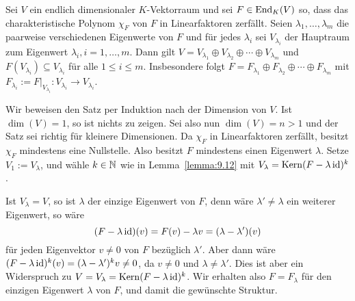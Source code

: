 \begin{satz}
	\label{satz:9.15}
	Sei $V$ ein endlich dimensionaler $K$-Vektorraum und sei $F \in \operatorname{End}_K(V)$ so, dass das charakteristische Polynom $\chi_F$ von $F$ in Linearfaktoren zerfällt.
	Seien $\lambda_1,\dots,\lambda_m$ die paarweise verschiedenen Eigenwerte von $F$ und für jedes $\lambda_i$ sei $V_{\lambda_i}$ der Hauptraum zum Eigenwert $\lambda_i, i = 1, \dots, m$.
	Dann gilt $V = V_{\lambda_1} \oplus V_{\lambda_2} \oplus \cdots \oplus V_{\lambda_m}$ und $F(V_{\lambda_i}) \subseteq V_{\lambda_i}$ für alle $1 \leq i \leq m$.
	Insbesondere folgt $F = F_{\lambda_1} \oplus F_{\lambda_2} \oplus \cdots \oplus F_{\lambda_m}$ mit $F_{\lambda_i} := F\big|_{V_{\lambda_i}} \colon V_{\lambda_i} \rightarrow V_{\lambda_i}$.
\end{satz}

\begin{beweis}
	Wir beweisen den Satz per Induktion nach der Dimension von $V$.
	Ist $\dim(V) = 1$, so ist nichts zu zeigen.
	Sei also nun $\dim(V) = n > 1$ und der Satz sei richtig für kleinere Dimensionen.
	Da $\chi_F$ in Linearfaktoren zerfällt, besitzt $\chi_F$ mindestens eine Nullstelle.
	Also besitzt $F$ mindestens einen Eigenwert $\lambda$.
	Setze $V_1 := V_\lambda$, und wähle $k \in \mathbb{N}$ wie in Lemma~\ref{lemma:9.12} mit $V_\lambda = \operatorname{Kern}(F - \lambda \operatorname{id})^k$.
	
	Ist $V_\lambda = V$, so ist $\lambda$ der einzige Eigenwert von $F$, denn wäre $\lambda' \neq \lambda$ ein weiterer Eigenwert, so wäre
	\[
		(F-\lambda \operatorname{id})(v) = F(v) - \lambda v = (\lambda - \lambda')(v)
	\]
	für jeden Eigenvektor $v \neq 0$ von $F$ bezüglich $\lambda'$.
	Aber dann wäre $(F-\lambda \operatorname{id})^k(v) = (\lambda - \lambda')^kv \neq 0$, da $v \neq 0$ und $\lambda \neq \lambda'$.
	Dies ist aber ein Widerspruch zu $V = V_\lambda = \operatorname{Kern}(F - \lambda \operatorname{id})^k$.
	Wir erhalten also $F = F_\lambda$ für den einzigen Eigenwert $\lambda$ von $F$, und damit die gewünschte Struktur.
	

\end{beweis}
